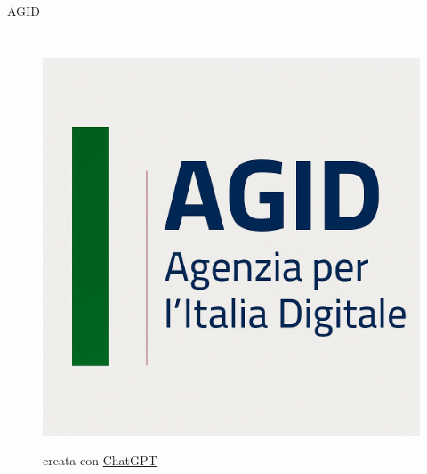 \documentclass[aspectratio=1610]{beamer}
\begin{document}
\begin{frame}{AGID}
    \begin{columns}
        \begin{figure}
            \href{https://www.agid.gov.it/it}{\includegraphics[width=\linewidth]{img/agid.png}}
            \caption{{creata con \href{https://chatgpt.com/}{ChatGPT}}}
        \end{figure}
    \end{columns}
\end{frame}
\end{document}
